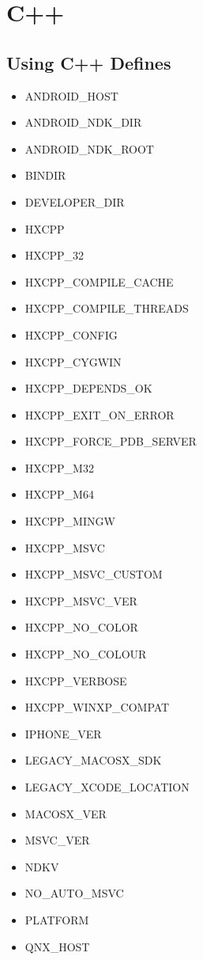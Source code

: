 \section{C++}
\label{target-cpp}

\subsection{Using C++ Defines}
\label{target-cpp-defines}
\begin{itemize}
    \item ANDROID_HOST
    \item ANDROID_NDK_DIR
    \item ANDROID_NDK_ROOT
    \item BINDIR
    \item DEVELOPER_DIR
    \item HXCPP
    \item HXCPP_32
    \item HXCPP_COMPILE_CACHE
    \item HXCPP_COMPILE_THREADS
    \item HXCPP_CONFIG
    \item HXCPP_CYGWIN
    \item HXCPP_DEPENDS_OK
    \item HXCPP_EXIT_ON_ERROR
    \item HXCPP_FORCE_PDB_SERVER
    \item HXCPP_M32
    \item HXCPP_M64
    \item HXCPP_MINGW
    \item HXCPP_MSVC
    \item HXCPP_MSVC_CUSTOM
    \item HXCPP_MSVC_VER
    \item HXCPP_NO_COLOR
    \item HXCPP_NO_COLOUR
    \item HXCPP_VERBOSE
    \item HXCPP_WINXP_COMPAT
    \item IPHONE_VER
    \item LEGACY_MACOSX_SDK
    \item LEGACY_XCODE_LOCATION
    \item MACOSX_VER
    \item MSVC_VER
    \item NDKV
    \item NO_AUTO_MSVC
    \item PLATFORM
    \item QNX_HOST

\end{itemize}
